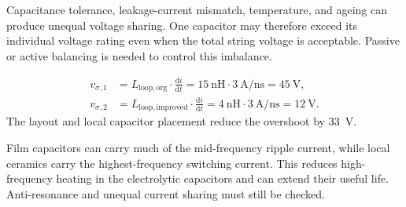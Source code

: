 
\begin{solutionblock}
    Capacitance tolerance, leakage-current mismatch, temperature, and ageing can
    produce unequal voltage sharing. One capacitor may therefore exceed its
    individual voltage rating even when the total string voltage is acceptable.
    Passive or active balancing is needed to control this imbalance.
\end{solutionblock}


\begin{solutionblock}
    \begin{align}
        v_{\sigma,1}&=L_\mathrm{loop, org} \cdot \frac{\mathrm{d}i}{\mathrm{d}t}=\SI{15}{\nano\henry}\cdot
        \SI{3}{\ampere\per\nano\second}=\SI{45}{\volt},\\
        v_{\sigma,2}&=L_\mathrm{loop, improved} \cdot \frac{\mathrm{d}i}{\mathrm{d}t}=\SI{4}{\nano\henry}\cdot
        \SI{3}{\ampere\per\nano\second}=\SI{12}{\volt}.
    \end{align}
    The layout and local capacitor placement reduce the overshoot by \SI{33}{\volt}.
\end{solutionblock}


\begin{solutionblock}
    Film capacitors can carry much of the mid-frequency ripple current, while
    local ceramics carry the highest-frequency switching current. This reduces
    high-frequency heating in the electrolytic capacitors and can extend their
    useful life. Anti-resonance and unequal current sharing must still be checked.
\end{solutionblock}




